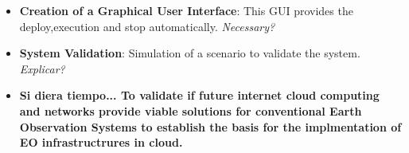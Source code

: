 \begin{itemize}
\item {\textbf{Creation of a Graphical User Interface}: This GUI provides
  the deploy,execution and stop automatically. \emph{Necessary?}} 

\item {\textbf{System Validation}: Simulation of a scenario to validate the
  system. \emph{Explicar?}}

\item \textbf{Si diera tiempo... To validate if future internet cloud computing
  and networks provide viable solutions for conventional Earth Observation
  Systems to establish the basis for the implmentation of EO infrastructrures in
  cloud.}

\end{itemize}
